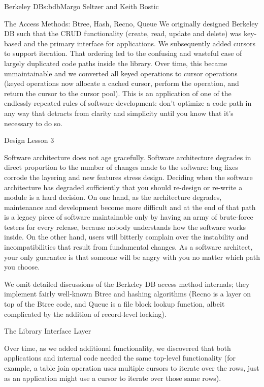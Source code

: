 \begin{aosachapter}{Berkeley DB}{s:bdb}{Margo Seltzer and Keith Bostic}
\begin{aosasect1}{The Access Methods: Btree, Hash, Recno, Queue}
We originally designed Berkeley DB such that the CRUD functionality
(create, read, update and delete) was key-based and the primary
interface for applications. We subsequently added cursors to support
iteration. That ordering led to the confusing and wasteful case of
largely duplicated code paths inside the library.  Over time, this
became unmaintainable and we converted all keyed operations to cursor
operations (keyed operations now allocate a cached cursor, perform the
operation, and return the cursor to the cursor pool).  This is an
application of one of the endlessly-repeated rules of software
development: don't optimize a code path in any way that detracts from
clarity and simplicity until you know that it's necessary to do so. 

\begin{aosabox}{Design Lesson 3}

Software architecture does not age gracefully. Software architecture
degrades in direct proportion to the number of changes made to the
software: bug fixes corrode the layering and new features stress
design. Deciding when the software architecture has degraded
sufficiently that you should re-design or re-write a module is a hard
decision. On one hand, as the architecture degrades, maintenance and
development become more difficult and at the end of that path is a
legacy piece of software maintainable only by having an army of
brute-force testers for every release, because nobody understands how
the software works inside. On the other hand, users will bitterly
complain over the instability and incompatibilities that result from
fundamental changes. As a software architect, your only guarantee is
that someone will be angry with you no matter which path you choose.

\end{aosabox}

We omit detailed discussions of the Berkeley DB access method
internals; they implement fairly well-known Btree and hashing
algorithms (Recno is a layer on top of the Btree code, and Queue is a
file block lookup function, albeit complicated by the addition of
record-level locking).

\end{aosasect1}

\begin{aosasect1}{The Library Interface Layer}
\label{sec.bdb.int}

Over time, as we added additional functionality, we discovered that
both applications and internal code needed the same top-level
functionality (for example, a table join operation uses multiple
cursors to iterate over the rows, just as an application might use a
cursor to iterate over those same rows).


\end{aosasect1}
\end{aosachapter}
